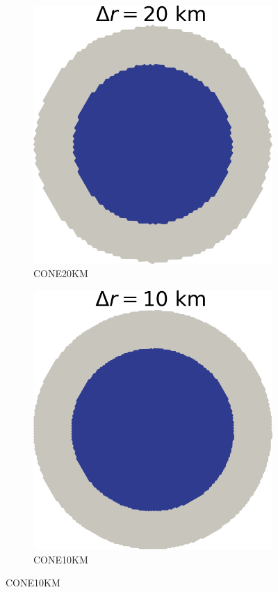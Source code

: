 \documentclass{article}
\begin{document}
\begin{figure}[!h]
\begin{subfigure}{0.25\textwidth}
		\includegraphics[width=\linewidth]{../fig/Grounded_zone_20km_CONE.png}
		\caption{CONE20KM}
		\label{figCONE20}
	\end{subfigure}\hfil %
	\begin{subfigure}{0.25\textwidth}
		\includegraphics[width=\linewidth]{../fig/Grounded_zone_10km_CONE.png}
		\caption{CONE10KM}
		\label{figCONE10KM}
	\end{subfigure}
	

\end{figure}
\end{document}
